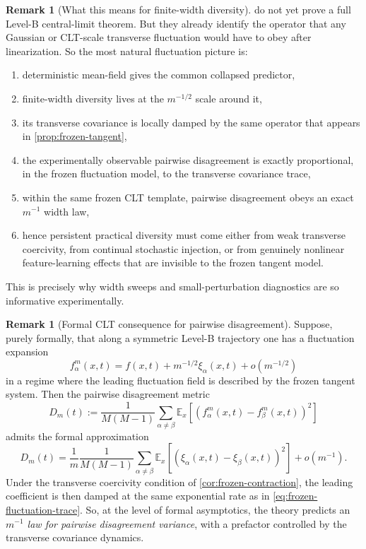 \documentclass[11pt]{article}
\theoremstyle{definition}
\newtheorem{remark}[theorem]{Remark}
\newcommand{\E}{\mathbb{E}}
\begin{document}
\begin{remark}[What this means for finite-width diversity]
\label{rem:frozen-fluctuation}
 do not yet prove a full Level-B central-limit theorem.
But they already identify the operator that any Gaussian or CLT-scale transverse fluctuation would have to obey after linearization.
So the most natural fluctuation picture is:
\begin{enumerate}[leftmargin=2em]
  \item deterministic mean-field gives the common collapsed predictor,
  \item finite-width diversity lives at the $m^{-1/2}$ scale around it,
  \item its transverse covariance is locally damped by the same operator that appears in \cref{prop:frozen-tangent},
  \item the experimentally observable pairwise disagreement is exactly proportional, in the frozen fluctuation model, to the transverse covariance trace,
  \item within the same frozen CLT template, pairwise disagreement obeys an exact $m^{-1}$ width law,
  \item hence persistent practical diversity must come either from weak transverse coercivity, from continual stochastic injection, or from genuinely nonlinear feature-learning effects that are invisible to the frozen tangent model.
\end{enumerate}
This is precisely why width sweeps and small-perturbation diagnostics are so informative experimentally.
\end{remark}

\begin{remark}[Formal CLT consequence for pairwise disagreement]
\label{rem:formal-clt-disagreement}
Suppose, purely formally, that along a symmetric Level-B trajectory one has a fluctuation expansion
\[
  f_\alpha^m(x,t)
  =
  f(x,t)+m^{-1/2}\xi_\alpha(x,t)+o(m^{-1/2})
\]
in a regime where the leading fluctuation field is described by the frozen tangent system.
Then the pairwise disagreement metric
\[
  D_m(t)
  :=
  \frac{1}{M(M-1)}\sum_{\alpha\neq\beta}
  \E_x[(f_\alpha^m(x,t)-f_\beta^m(x,t))^2]
\]
admits the formal approximation
\[
  D_m(t)
  =
  \frac{1}{m}
  \frac{1}{M(M-1)}\sum_{\alpha\neq\beta}
  \E_x[(\xi_\alpha(x,t)-\xi_\beta(x,t))^2]
  +
  o(m^{-1}).
\]
Under the transverse coercivity condition of \cref{cor:frozen-contraction},
the leading coefficient is then damped at the same exponential rate as in \cref{eq:frozen-fluctuation-trace}.
So, at the level of formal asymptotics, the theory predicts an \emph{$m^{-1}$ law for pairwise disagreement variance}, with a prefactor controlled by the transverse covariance dynamics.
\end{remark}
\end{document}
